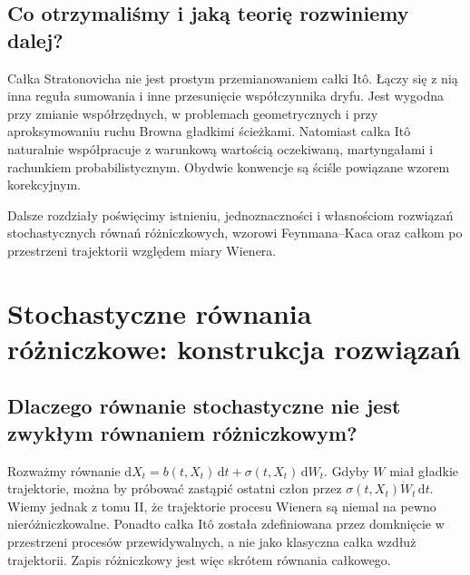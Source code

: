 \documentclass[11pt,a4paper,oneside]{report}
\numberwithin{equation}{chapter}
\theoremstyle{plain}
\theoremstyle{definition}
\theoremstyle{remark}
\newcommand{\dd}{\mathrm{d}}
\begin{document}
\section{Co otrzymaliśmy i jaką teorię rozwiniemy dalej?}\label{sec:volIII:04:07}
Całka Stratonovicha nie jest prostym przemianowaniem
całki Itô. Łączy się z nią inna reguła sumowania i
inne przesunięcie współczynnika dryfu. Jest wygodna
przy zmianie współrzędnych, w problemach geometrycznych
i przy aproksymowaniu ruchu Browna gładkimi ścieżkami.
Natomiast całka Itô naturalnie współpracuje z
warunkową wartością oczekiwaną, martyngałami i
rachunkiem probabilistycznym. Obydwie konwencje są
ściśle powiązane wzorem korekcyjnym.

Dalsze rozdziały poświęcimy istnieniu, jednoznaczności
i własnościom rozwiązań stochastycznych równań
różniczkowych, wzorowi Feynmana--Kaca oraz całkom
po przestrzeni trajektorii względem miary Wienera.


\chapter{Stochastyczne równania różniczkowe: konstrukcja rozwiązań}
\label{chap:volIII:05}
\par\smallskip{}\par\smallskip

\label{ch:sde-existence}

\section{Dlaczego równanie stochastyczne nie jest zwykłym równaniem różniczkowym?}\label{sec:volIII:05:01}
Rozważmy równanie $\dd X_t=b(t,X_t)\,\dd t+\sigma(t,X_t)\,\dd W_t$.
Gdyby $W$ miał gładkie trajektorie, można by próbować zastąpić
ostatni człon przez $\sigma(t,X_t)\dot W_t\,\dd t$.
Wiemy jednak z tomu II, że trajektorie procesu Wienera
są niemal na pewno nieróżniczkowalne. Ponadto całka Itô
została zdefiniowana przez domknięcie w przestrzeni procesów
przewidywalnych, a nie jako klasyczna całka wzdłuż trajektorii.
Zapis różniczkowy jest więc skrótem równania całkowego.
\end{document}
